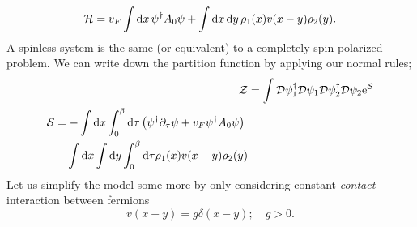 \begin{equation}
\mathcal{H} = v_F \int\dd{x}\psi^\dagger A_0\psi+ \int \dd{x}\dd{y} \rho_{1}(x)v(x-y)\rho_{2}(y).
\end{equation}
A spinless system is the same (or equivalent) to a completely spin-polarized problem. We can write down the partition function by applying our normal rules;
\begin{align}
\mathcal{Z} &= \int\mathcal{D}\psi_1^\dagger\mathcal{D}\psi_1\mathcal{D}\psi_2^\dagger\mathcal{D}\psi_2\mathrm{e}^{\mathcal{S}} \\
\begin{split}
\mathcal{S} &= -\int\dd{x} \int_0^\beta\dd\tau\left(\psi^\dagger\partial_\tau\psi + v_F\psi^\dagger A_0\psi\right) \\
&- \int\dd{x}\int\dd{y} \int_0^\beta\dd\tau\rho_{1}(x)v(x-y)\rho_{2}(y)
\end{split}
\end{align}
Let us simplify the model some more by only considering constant \textit{contact}-interaction between fermions 
\begin{equation}
	v(x-y) = g\delta(x-y); \quad g>0.
\end{equation}

